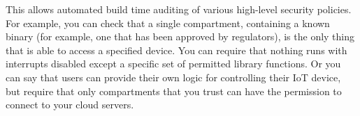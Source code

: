 This allows automated build time auditing of various high-level security policies.
For example, you can check that a single compartment, containing a known binary (for example, one that has been approved by regulators), is the only thing that is able to access a specified device.
You can require that nothing runs with interrupts disabled except a specific set of permitted library functions.
Or you can say that users can provide their own logic for controlling their IoT device, but require that only compartments that you trust can have the permission to connect to your cloud servers.

